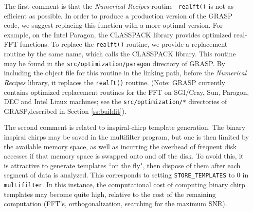 The first comment is that the {\it Numerical Recipes} routine {\tt
realft()} is not as efficient as possible.  In order to produce a
production version of the GRASP code, we suggest replacing this function
with a more-optimal version.  For example, on the Intel Paragon, the
CLASSPACK library provides optimized real-FFT functions.  To replace
the {\tt realft()} routine, we provide a replacement routine by the
same name, which calls the CLASSPACK library.  This routine may be
found in the {\tt src/optimization/paragon} directory of GRASP.  By including
the object file for this routine in the linking path, before the {\it Numerical
Recipes} library, it replaces the {\tt realft()} routine.
(Note: GRASP currently contains optimized replacement routines for
the FFT on SGI/Cray, Sun, Paragon, DEC and Intel Linux machines; see the
{\tt src/optimization/*} directories of GRASP,described in
Section \ref{ss:buildit}).

The second comment is related to inspiral-chirp template generation. The
binary inspiral chirps may be saved in the multifilter program, but
one is then limited by the available memory space, as well as incurring
the overhead of frequent disk accesses if that memory space is swapped
onto and off the disk.  To avoid this, it is attractive to generate
templates ``on the fly", then dispose of them after each segment of
data is analyzed.  This corresponds to setting {\tt STORE\_TEMPLATES}
to 0 in {\tt multifilter}.  In this instance, the computational cost of
computing binary chirp templates may become quite high, relative to the
cost of the remaining computation (FFT's, orthogonalization, searching
for the maximum SNR).

